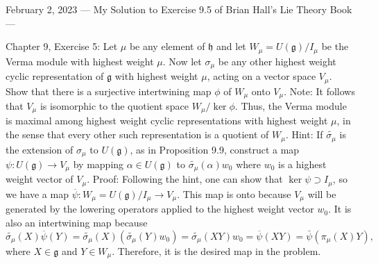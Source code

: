 February 2, 2023
---
My Solution to Exercise 9.5 of Brian Hall's Lie Theory Book
---

Chapter 9, Exercise 5: Let $\mu$ be any element of $\mathfrak{h}$ and let $W_\mu = U(\mathfrak{g})/I_\mu$ be the Verma module with highest weight $\mu$. 
Now let $\sigma_\mu$ be any other highest weight cyclic representation of $\mathfrak{g}$ with highest weight $\mu$, acting on a vector space $V_\mu$. 
Show that there is a surjective intertwining map $\phi$ of $W_\mu$ onto $V_\mu$.
Note: It follows that $V_\mu$ is isomorphic to the quotient space $W_\mu/\ker \phi$. Thus, the Verma module is maximal among highest weight cyclic representations with highest weight $\mu$, in the sense that every other such representation is a quotient of $W_\mu.$
Hint: If $\tilde{\sigma_\mu}$ is the extension of $\sigma_\mu$ to $U(\mathfrak{g})$, as in Proposition 9.9, construct a map $\psi: U(\mathfrak{g}) \to V_\mu$ by mapping $\alpha \in U(\mathfrak{g})$ to $\tilde{\sigma_\mu}(\alpha)w_0$ where $w_0$ is a highest weight vector of $V_\mu$.
Proof: Following the hint, one can show that $\ker \psi \supset I_\mu$, so we have a map $\overline{\psi}:W_\mu = U(\mathfrak{g})/I_\mu \to V_\mu.$ This map is onto because $V_\mu$ will be generated by the lowering operators applied to the highest weight vector $w_0$. It is also an intertwining map because $$\tilde{\sigma_\mu}(X)\overline{\psi}(Y) = \tilde{\sigma_\mu}(X)(\tilde{\sigma_\mu}(Y)w_0) = \tilde{\sigma_\mu}(XY)w_0 = \overline{\psi}(XY) = \bar{\psi}(\pi_\mu(X)Y),$$
where $X\in \mathfrak{g}$ and $Y\in W_\mu$. Therefore, it is the desired map in the problem.